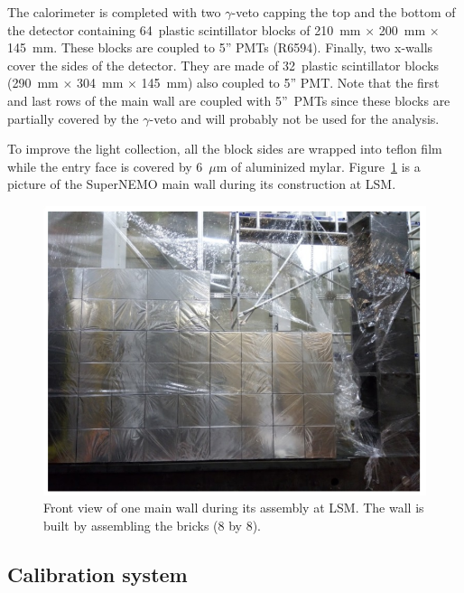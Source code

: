 \documentclass[main.tex]{subfiles}
\begin{document}
\NI The calorimeter is completed with two $\gamma$-veto capping the top and the bottom of the detector containing 64~plastic scintillator blocks of 210~mm $\times$ 200~mm $\times$ 145~mm. These blocks are coupled to 5'' PMTs (R6594). Finally, two x-walls cover the sides of the detector. They are made of 32~plastic scintillator blocks (290~mm $\times$ 304~mm $\times$ 145~mm) also coupled to 5'' PMT. Note that the first and last rows of the main wall are coupled with 5''~PMTs since these blocks are partially covered by the $\gamma$-veto and will probably not be used for the analysis.

\bigskip


\NI To improve the light collection, all the block sides are wrapped into teflon film while the entry face is covered by 6~$\mu$m of aluminized mylar. Figure~\ref{SnemoCaloFrontView} is a picture of the SuperNEMO main wall during its construction at LSM. %


\begin{figure}[h!]
\begin{center}
\includegraphics[scale=0.5]{pictures/Chap3/FrontViewCalo.png}
\caption{Front view of one main wall during its assembly at LSM. The wall is built by assembling the bricks (8 by 8).}
\label{SnemoCaloFrontView}
\end{center}
\end{figure}

\FloatBarrier


\subsection{Calibration system}
\end{document}

